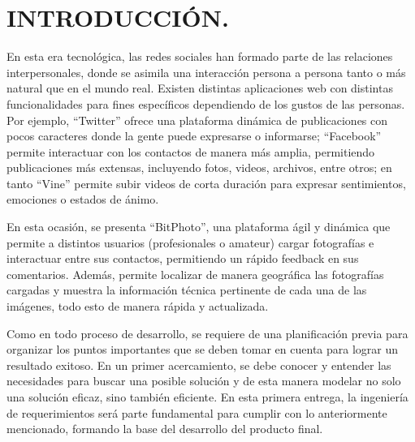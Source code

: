 \documentclass{memoria}
\begin{document}


\indices

\chapter*{INTRODUCCIÓN.}

En esta era tecnológica, las redes sociales han formado parte de las relaciones interpersonales, donde se asimila una interacción persona a persona tanto o más natural que en el mundo real. Existen distintas aplicaciones web con distintas funcionalidades para fines específicos dependiendo de los gustos de las personas. Por ejemplo, “Twitter” ofrece una plataforma dinámica de publicaciones con pocos caracteres donde la gente puede expresarse o informarse; “Facebook” permite interactuar con los contactos de manera más amplia, permitiendo publicaciones más extensas, incluyendo fotos, videos, archivos, entre otros; en tanto “Vine” permite subir videos de corta duración para expresar sentimientos, emociones o estados de ánimo.

En esta ocasión, se presenta “BitPhoto”, una plataforma ágil y dinámica que permite a distintos usuarios (profesionales o amateur) cargar fotografías e interactuar entre sus contactos, permitiendo un rápido feedback en sus comentarios. Además, permite localizar de manera geográfica las fotografías cargadas y muestra la información técnica pertinente de cada una de las imágenes, todo esto de manera rápida y actualizada.

Como en todo proceso de desarrollo, se requiere de una planificación previa para organizar los puntos importantes que se deben tomar en cuenta para lograr un resultado exitoso. En un primer acercamiento, se debe conocer y entender las necesidades para buscar una posible solución y de esta manera modelar no solo una solución eficaz, sino también eficiente. En esta primera entrega, la ingeniería de requerimientos será parte fundamental para cumplir con lo anteriormente mencionado, formando la base del desarrollo del producto final.
\end{document}

